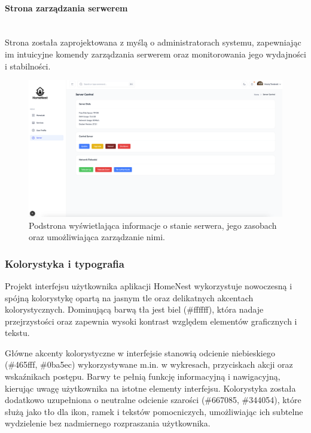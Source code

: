 \paragraph{Strona zarządzania serwerem}\mbox{}\\

Strona została zaprojektowana z myślą o administratorach systemu, zapewniając im intuicyjne komendy zarządzania serwerem oraz monitorowania jego wydajności i stabilności.

\begin{figure}[H]
  \centering
  \includegraphics[width=1\textwidth]{./chapters/assets/server_page.png}
  \caption{Podstrona wyświetlająca informacje o stanie serwera, jego zasobach oraz umożliwiająca zarządzanie nimi.}
  \label{fig:ui_server_page}
\end{figure}

\subsubsection{Kolorystyka i typografia}
Projekt interfejsu użytkownika aplikacji HomeNest wykorzystuje nowoczesną i spójną kolorystykę opartą na jasnym tle oraz delikatnych akcentach kolorystycznych. Dominującą barwą tła jest biel (\#ffffff), która nadaje przejrzystości oraz zapewnia wysoki kontrast względem elementów graficznych i tekstu.

Główne akcenty kolorystyczne w interfejsie stanowią odcienie niebieskiego (\#465fff, \#0ba5ec) wykorzystywane m.in. w wykresach, przyciskach akcji oraz wskaźnikach postępu. Barwy te pełnią funkcję informacyjną i nawigacyjną, kierując uwagę użytkownika na istotne elementy interfejsu. Kolorystyka została dodatkowo uzupełniona o neutralne odcienie szarości (\#667085, \#344054), które służą jako tło dla ikon, ramek i tekstów pomocniczych, umożliwiając ich subtelne wydzielenie bez nadmiernego rozpraszania użytkownika.

